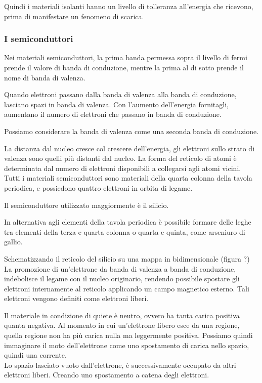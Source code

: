 \documentclass[../template]{subfiles}
\begin{document}
Quindi i materiali isolanti hanno un livello di tolleranza all'energia che ricevono, prima di manifestare un fenomeno di scarica.

\subsubsection{I semiconduttori}
Nei materiali semiconduttori, la prima banda permessa sopra il livello di fermi prende il valore di banda di conduzione,
mentre la prima al di sotto prende il nome di banda di valenza.

Quando elettroni passano dalla banda di valenza alla banda di conduzione, lasciano spazi in banda di valenza.
Con l'aumento dell'energia fornitagli, aumentano il numero di elettroni che passano in banda di conduzione.

Possiamo considerare la banda di valenza come una seconda banda di conduzione.

La distanza dal nucleo cresce col crescere dell'energia, gli elettroni sullo strato di valenza sono quelli più distanti dal nucleo.
La forma del reticolo di atomi è determinata dal numero di elettroni disponibili a collegarsi agli atomi vicini.
Tutti i materiali semiconduttori sono materiali della quarta colonna della tavola periodica, e possiedono quattro elettroni in orbita di legame.

Il semiconduttore utilizzato maggiormente è il silicio.

In alternativa agli elementi della tavola periodica è possibile formare delle leghe tra elementi della terza e quarta colonna o quarta e quinta, come arseniuro di gallio.

Schematizzando il reticolo del silicio su una mappa in bidimensionale (figura ?)
La promozione di un'elettrone da banda di valenza a banda di conduzione, indebolisce il legame con il nucleo originario, rendendo possibile spostare gli elettroni internamente al reticolo applicando un campo magnetico esterno.
Tali elettroni vengono definiti come elettroni liberi.

Il materiale in condizione di quiete è neutro, ovvero ha tanta carica positiva quanta negativa. Al momento in cui un'elettrone libero esce da una regione, quella regione non ha più carica nulla ma leggermente positiva. Possiamo quindi immaginare il moto dell'elettrone come uno spostamento di carica nello spazio, quindi una corrente.
\\
Lo spazio lasciato vuoto dall'elettrone, è successivamente occupato da altri elettroni liberi. Creando uno spostamento a catena degli elettroni.
\end{document}
